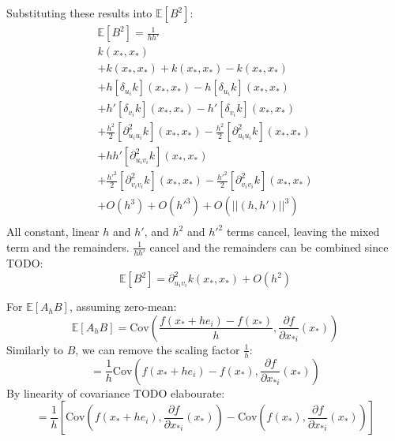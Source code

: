 Substituting these results into $\mathbb{E}[B^2]$:
\begin{equation*}
    \begin{aligned}
        \mathbb{E}[B^2] = \frac{1}{hh'} \\
        k(x_*,x_*) \\
        + k(x_*,x_*) + k(x_*,x_*) - k(x_*,x_*) \\
        + h [\delta_{u_i}k](x_*, x_*) - h [\delta_{u_i}k](x_*, x_*) \\
        + h' [\delta_{v_i}k](x_*, x_*) - h' [\delta_{v_i}k](x_*, x_*) \\
        + \frac{h^2}{2} [\partial_{u_i u_i}^2k](x_*, x_*) -  \frac{h^2}{2} [\partial_{u_i u_i}^2k](x_*, x_*) \\
        + hh' [\partial_{u_i v_i}^2k](x_*, x_*) \\
        + \frac{h'^2}{2} [\partial_{v_i v_i}^2k](x_*, x_*) - \frac{h'^2}{2} [\partial_{v_i v_i}^2k](x_*, x_*) \\
        + O(h^3) + O(h'^3) + O(||(h,h')||^3) \\
    \end{aligned}
\end{equation*}
All constant, linear $h$ and $h'$, and $h^2$ and $h'^2$ terms cancel, leaving the mixed term and the remainders. $\frac{1}{hh'}$ cancel and the remainders can be combined since TODO:
\begin{equation} \label{eq:msd_b_final}
    \mathbb{E}[B^2] = \partial_{u_i v_i}^2 k(x_*, x_*) + O(h^2)
\end{equation}

For $\mathbb{E}[A_h B]$, assuming zero-mean:
\begin{equation*}
    \mathbb{E}[A_h B] = \text{Cov} \left( \frac{f(x_* + h e_i) - f(x_*)}{h}, \frac{\partial f}{\partial x_{*i}}(x_*) \right)
\end{equation*}
Similarly to $B$, we can remove the scaling factor $\frac{1}{h}$:
\begin{equation*}
    = \frac{1}{h} \text{Cov} \left( f(x_* + h e_i) - f(x_*), \frac{\partial f}{\partial x_{*i}}(x_*) \right)
\end{equation*}
By linearity of covariance TODO elabourate:
\begin{equation*}
    = \frac{1}{h} \left[ \text{Cov} (f(x_* + h e_i), \frac{\partial f}{\partial x_{*i}}(x_*) ) - \text{Cov} (f(x_*), \frac{\partial f}{\partial x_{*i}}(x_*)) \right]
\end{equation*}

